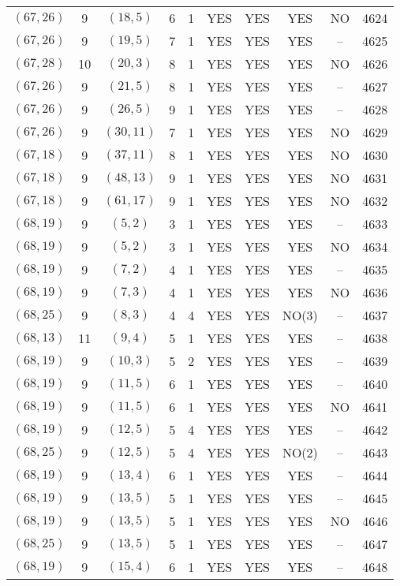 \begin{longtable}{|c|c|c|c|c|c|c|c|c|c|}
$(67, 26)$ & 9 & $(18, 5)$ & 6 & 1 & YES & YES & YES & NO & 4624\\
$(67, 26)$ & 9 & $(19, 5)$ & 7 & 1 & YES & YES & YES & -- & 4625\\
$(67, 28)$ & 10 & $(20, 3)$ & 8 & 1 & YES & YES & YES & NO & 4626\\
$(67, 26)$ & 9 & $(21, 5)$ & 8 & 1 & YES & YES & YES & -- & 4627\\
$(67, 26)$ & 9 & $(26, 5)$ & 9 & 1 & YES & YES & YES & -- & 4628\\
$(67, 26)$ & 9 & $(30, 11)$ & 7 & 1 & YES & YES & YES & NO & 4629\\
$(67, 18)$ & 9 & $(37, 11)$ & 8 & 1 & YES & YES & YES & NO & 4630\\
$(67, 18)$ & 9 & $(48, 13)$ & 9 & 1 & YES & YES & YES & NO & 4631\\
$(67, 18)$ & 9 & $(61, 17)$ & 9 & 1 & YES & YES & YES & NO & 4632\\
$(68, 19)$ & 9 & $(5, 2)$ & 3 & 1 & YES & YES & YES & -- & 4633\\
$(68, 19)$ & 9 & $(5, 2)$ & 3 & 1 & YES & YES & YES & NO & 4634\\
$(68, 19)$ & 9 & $(7, 2)$ & 4 & 1 & YES & YES & YES & -- & 4635\\
$(68, 19)$ & 9 & $(7, 3)$ & 4 & 1 & YES & YES & YES & NO & 4636\\
$(68, 25)$ & 9 & $(8, 3)$ & 4 & 4 & YES & YES & NO(3) & -- & 4637\\
$(68, 13)$ & 11 & $(9, 4)$ & 5 & 1 & YES & YES & YES & -- & 4638\\
$(68, 19)$ & 9 & $(10, 3)$ & 5 & 2 & YES & YES & YES & -- & 4639\\
$(68, 19)$ & 9 & $(11, 5)$ & 6 & 1 & YES & YES & YES & -- & 4640\\
$(68, 19)$ & 9 & $(11, 5)$ & 6 & 1 & YES & YES & YES & NO & 4641\\
$(68, 19)$ & 9 & $(12, 5)$ & 5 & 4 & YES & YES & YES & -- & 4642\\
$(68, 25)$ & 9 & $(12, 5)$ & 5 & 4 & YES & YES & NO(2) & -- & 4643\\
$(68, 19)$ & 9 & $(13, 4)$ & 6 & 1 & YES & YES & YES & -- & 4644\\
$(68, 19)$ & 9 & $(13, 5)$ & 5 & 1 & YES & YES & YES & -- & 4645\\
$(68, 19)$ & 9 & $(13, 5)$ & 5 & 1 & YES & YES & YES & NO & 4646\\
$(68, 25)$ & 9 & $(13, 5)$ & 5 & 1 & YES & YES & YES & -- & 4647\\
$(68, 19)$ & 9 & $(15, 4)$ & 6 & 1 & YES & YES & YES & -- & 4648\\

\end{longtable}
